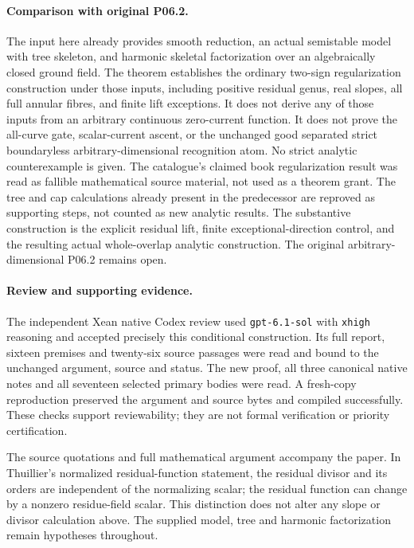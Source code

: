 \documentclass[11pt]{article}
\begin{document}
\paragraph{Comparison with original P06.2.}
The input here already provides smooth reduction, an actual
semistable model with tree skeleton, and harmonic skeletal
factorization over an algebraically closed ground field.
The theorem establishes the ordinary two-sign regularization
construction under those inputs, including positive residual
genus, real slopes, all full annular fibres, and finite lift
exceptions. It does not derive any of those inputs from an
arbitrary continuous zero-current function. It does not prove
the all-curve gate, scalar-current ascent, or the unchanged
good separated strict boundaryless arbitrary-dimensional
recognition atom. No strict analytic counterexample is given.
The catalogue's claimed book regularization result was read
as fallible mathematical source material, not used as a theorem
grant. The tree and cap calculations already present in the
predecessor are reproved as supporting steps, not counted as
new analytic results. The substantive construction is
the explicit residual lift, finite exceptional-direction
control, and the resulting actual whole-overlap analytic
construction. The original arbitrary-dimensional P06.2 remains open.

\paragraph{Review and supporting evidence.}
The independent Xean native Codex review used \texttt{gpt-6.1-sol}
with \texttt{xhigh} reasoning and accepted precisely this conditional
construction. Its full report, sixteen premises and twenty-six source
passages were read and bound to the unchanged argument, source and status.
The new proof, all three canonical native notes and all seventeen selected
primary bodies were read. A fresh-copy reproduction preserved the argument
and source bytes and compiled successfully. These checks support reviewability;
they are not formal verification or priority certification.

The source quotations and full mathematical argument accompany the paper.
In Thuillier's normalized residual-function statement, the residual divisor
and its orders are independent of the normalizing scalar; the residual
function can change by a nonzero residue-field scalar. This distinction
does not alter any slope or divisor calculation above. The supplied model,
tree and harmonic factorization remain hypotheses throughout.
\end{document}
